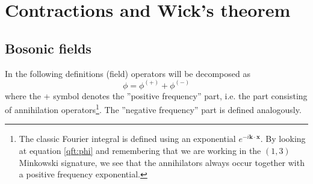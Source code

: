 \section{Contractions and Wick's theorem}
\subsection{Bosonic fields}

    In the following definitions (field) operators will be decomposed as \[\phi = \phi^{(+)} + \phi^{(-)}\] where the + symbol denotes the ''positive frequency'' part, i.e. the part consisting of annihilation operators\footnote{The classic Fourier integral is defined using an exponential $e^{-i\mathbf{k\cdot x}}$. By looking at equation \ref{qft:phi} and remembering that we are working in the $(1, 3)$ Minkowski signature, we see that the annihilators always occur together with a positive frequency exponential.}. The ''negative frequency'' part is defined analogously.



